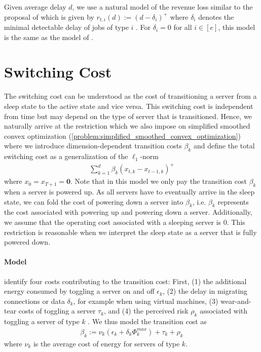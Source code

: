 Given average delay $d$, we use a natural model of the revenue loss similar to the proposal of \citeauthor*{Lin2011} which is given by $r_{t,i}(d) := (d - \delta_i)^+$ where $\delta_i$ denotes the minimal detectable delay of jobs of type $i$ \cite{Lin2011}. For $\delta_i = 0$ for all $i \in [e]$, this model is the same as the model of \cite{Lin2012}.

\section{Switching Cost}

The switching cost can be understood as the cost of transitioning a server from a sleep state to the active state and vice versa. This switching cost is independent from time but may depend on the type of server that is transitioned. Hence, we naturally arrive at the restriction which we also impose on simplified smoothed convex optimization (\autoref{problem:simplified_smoothed_convex_optimization}) where we introduce dimension-dependent transition costs $\beta_k$ and define the total switching cost as a generalization of the $\ell_1$-norm \begin{align*}
    \sum_{k=1}^d \beta_k (x_{t,k} - x_{t-1,k})^+
\end{align*} where $x_0 = x_{T+1} = \mathbf{0}$. Note that in this model we only pay the transition cost $\beta_k$ when a server is powered up. As all servers have to eventually arrive in the sleep state, we can fold the cost of powering down a server into $\beta_k$, i.e. $\beta_k$ represents the cost associated with powering up and powering down a server. Additionally, we assume that the operating cost associated with a sleeping server is $0$. This restriction is reasonable when we interpret the sleep state as a server that is fully powered down.

\paragraph{Model} \citeauthor*{Lin2011} identify four costs contributing to the transition cost: First, (1) the additional energy consumed by toggling a server on and off $\epsilon_k$, (2) the delay in migrating connections or data $\delta_k$, for example when using virtual machines, (3) wear-and-tear costs of toggling a server $\tau_k$, and (4) the perceived risk $\rho_k$ associated with toggling a server of type $k$ \cite{Lin2011}. We thus model the transition cost as \begin{align*}
    \beta_k := \nu_k(\epsilon_k + \delta_k \Phi_k^{max}) + \tau_k + \rho_k
\end{align*} where $\nu_k$ is the average cost of energy for servers of type $k$.


